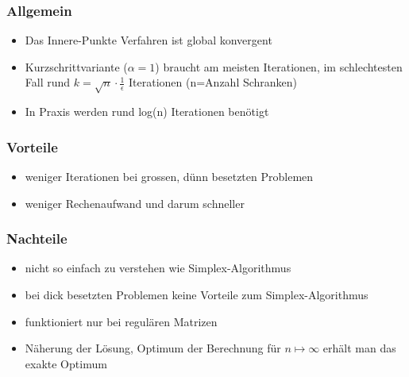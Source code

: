 \subsubsection{Allgemein}
\begin{itemize}
	\item Das Innere-Punkte Verfahren ist global konvergent
	\item {Kurzschrittvariante ($\alpha = 1$) braucht am meisten Iterationen, im schlechtesten Fall rund $k=\sqrt{n} \cdot \frac{1}{\epsilon}$ Iterationen (n=Anzahl Schranken)}
	\item In Praxis werden rund log(n) Iterationen benötigt
\end{itemize}

\subsubsection{Vorteile}
\begin{itemize}
	\item weniger Iterationen bei grossen, dünn besetzten Problemen
	\item weniger Rechenaufwand und darum schneller
\end{itemize}

\subsubsection{Nachteile}
\begin{itemize}
	\item nicht so einfach zu verstehen wie Simplex-Algorithmus
	\item bei dick besetzten Problemen keine Vorteile zum Simplex-Algorithmus
	\item funktioniert nur bei regulären Matrizen
	\item Näherung der Lösung, Optimum der Berechnung für $n\mapsto \infty$ erhält man das exakte Optimum
\end{itemize}

\newpage
